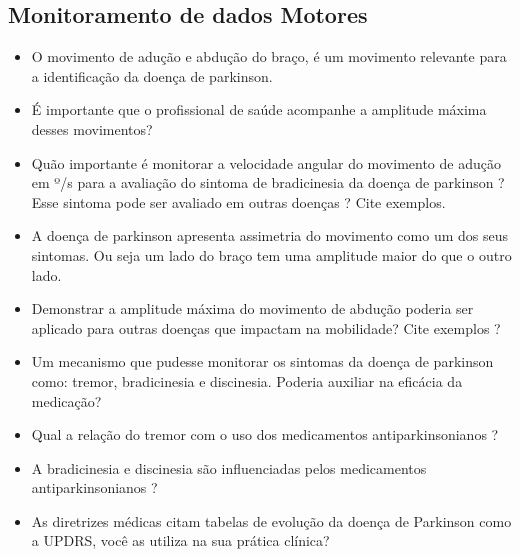 \subsection{Monitoramento de dados Motores}
\begin{itemize}
    \item O movimento  de adução e abdução do braço, é um movimento relevante para a identificação da doença de parkinson.
		\item É importante que o profissional de saúde acompanhe a amplitude máxima desses movimentos?
		\item Quão importante é monitorar a velocidade angular do movimento de adução em º/s para a avaliação do sintoma de bradicinesia da doença de parkinson ? Esse sintoma pode ser avaliado em outras doenças ? Cite exemplos.
		\item A doença de parkinson apresenta assimetria do movimento como um dos seus sintomas. Ou seja um lado do braço tem uma amplitude maior do que o outro lado.
		\item Demonstrar a amplitude máxima do movimento de abdução poderia ser aplicado para outras doenças que impactam na mobilidade? Cite exemplos ?		
		\item Um mecanismo que pudesse monitorar os sintomas da doença de parkinson como: tremor, bradicinesia e discinesia. Poderia auxiliar na eficácia da medicação?
		\item Qual a relação do tremor com o uso dos medicamentos antiparkinsonianos ?
		\item A bradicinesia e discinesia são influenciadas pelos medicamentos antiparkinsonianos ?
		\item As diretrizes médicas citam tabelas de evolução da doença de Parkinson como a UPDRS, você as utiliza na sua prática clínica?		
\end{itemize}

